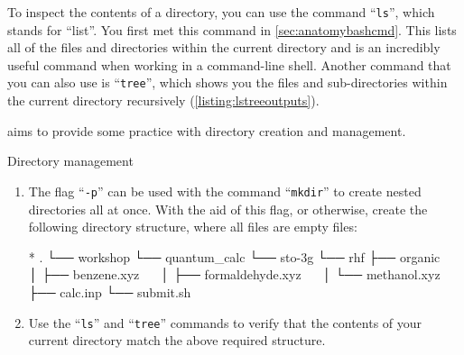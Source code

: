     To inspect the contents of a directory, you can use the command \enquote{\texttt{ls}}, which stands for \enquote{list}.
    You first met this command in \cref{sec:anatomybashcmd}.
    This lists all of the files and directories within the current directory and is an incredibly useful command when working in a command-line shell.
    Another command that you can also use is \enquote{\texttt{tree}}, which shows you the files and sub-directories within the current directory recursively (\cref{listing:lstreeoutputs}).


     aims to provide some practice with directory creation and management.

    \begin{task}[label=task:dirman]{Directory management}
      \begin{enumerate}[label=(\alph*)]
        \item The flag \enquote{\texttt{-p}} can be used with the command \enquote{\texttt{mkdir}} to create nested directories all at once.
        With the aid of this flag, or otherwise, create the following directory structure, where all files are empty files:
        \begin{bashoutput}*{}
          .
          └── workshop
              └── quantum_calc
                  └── sto-3g
                      └── rhf
                          ├── organic
                          │   ├── benzene.xyz
                          │   ├── formaldehyde.xyz
                          │   └── methanol.xyz
                          ├── calc.inp
                          └── submit.sh
        \end{bashoutput}

        \item Use the \enquote{\texttt{ls}} and \enquote{\texttt{tree}} commands to verify that the contents of your current directory match the above required structure.
      \end{enumerate}
    \end{task}

